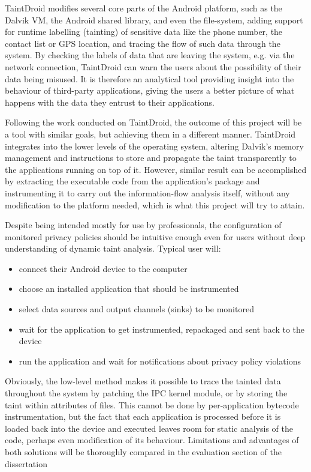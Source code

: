 \documentclass[12pt]{article}
\begin{document}
TaintDroid modifies several core parts of the Android platform, such as 
the Dalvik VM, the Android shared library, and even the file-system, 
adding support for runtime labelling (tainting) of sensitive data like the 
phone number, the contact list or GPS location, and tracing the flow of such 
data through the system. By checking the labels of data that are leaving the 
system, e.g. via the network connection, TaintDroid can warn the users about 
the possibility of their data being misused. It is therefore an analytical 
tool providing insight into the behaviour of third-party applications, giving 
the users a better picture of what happens with the data they entrust to 
their applications.

Following the work conducted on TaintDroid, the outcome of this project 
will be a tool with similar goals, but achieving them in a different 
manner. TaintDroid integrates into the lower levels of the operating 
system, altering Dalvik's memory management and instructions to store and
propagate the taint transparently to the applications running on top of 
it. However, similar result can be accomplished by extracting the 
executable code from the application's package and instrumenting it to 
carry out the information-flow analysis itself, without any modification 
to the platform needed, which is what this project will try to attain.

Despite being intended mostly for use by professionals, the configuration 
of monitored privacy policies should be intuitive enough even for users 
without deep understanding of dynamic taint analysis. Typical user will:
\begin{itemize}
\item{connect their Android device to the computer}
\item{choose an installed application that should be instrumented}
\item{select data sources and output channels (sinks) to be monitored}
\item{wait for the application to get instrumented, repackaged and sent
      back to the device}
\item{run the application and wait for notifications about privacy policy
      violations}
\end{itemize}

Obviously, the low-level method makes it possible to trace the tainted data 
throughout the system by patching the IPC kernel module, or by storing the 
taint within attributes of files. This cannot be done by per-application 
bytecode instrumentation, but the fact that each application is processed 
before it is loaded back into the device and executed leaves room for static 
analysis of the code, perhaps even modification of its behaviour. Limitations 
and advantages of both solutions will be thoroughly compared in the evaluation 
section of the dissertation
\end{document}
